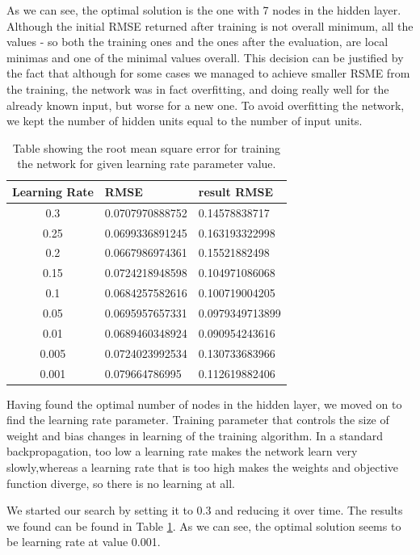 As we can see, the optimal solution is the one with 7 nodes in the hidden layer. Although the initial RMSE returned after training is not overall minimum, all the values - so both the training ones and the ones after the evaluation, are local minimas and one of the minimal values overall. This decision can be justified by the fact that although for some cases we managed to achieve smaller RSME from the training, the network was in fact overfitting, and doing really well for the already known input, but worse for a new one.
To avoid overfitting the network, we kept the number of hidden units equal to the number of input units. 

\begin{table}
\begin{center}
\begin{tabular} {| c | l | l |} \hline
 Learning Rate & RMSE & result RMSE \\  \hline \hline
 0.3 & 0.0707970888752 & 0.14578838717 \\ \hline
 0.25 & 0.0699336891245 & 0.163193322998 \\ \hline
 0.2 &  0.0667986974361 & 0.15521882498 \\ \hline
 0.15 & 0.0724218948598 & 0.104971086068 \\ \hline
 0.1 & 0.0684257582616 & 0.100719004205 \\ \hline
 0.05 & 0.0695957657331 & 0.0979349713899 \\ \hline
 0.01 & 0.0689460348924 & 0.090954243616 \\ \hline
 0.005 & 0.0724023992534 & 0.130733683966 \\ \hline
 0.001 &  0.079664786995 & 0.112619882406 \\ \hline
\end{tabular}
\caption{Table showing the root mean square error for training the network for given learning rate parameter value.}
\label{table:learningrate}
\end{center}
\end{table}

Having found the optimal number of nodes in the hidden layer, we moved on to find the learning rate parameter. Training parameter that controls the size of weight and bias changes in learning of the training algorithm. In a standard backpropagation, too low a learning rate makes the network learn very slowly,whereas a learning rate that is too high makes the weights and objective function diverge, so there is no learning at all. 

We started our search by setting it to 0.3 and reducing it over time. The results we found can be found in Table \ref{table:learningrate}. As we can see, the optimal solution seems to be learning rate at value 0.001.


